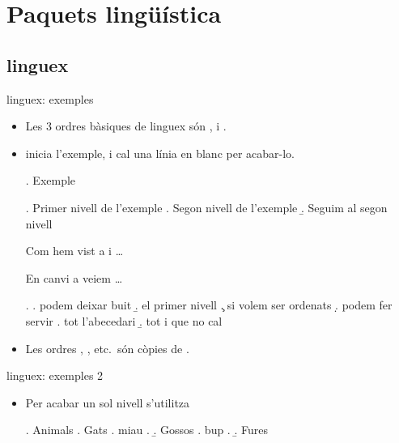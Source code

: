 \section{Paquets lingüística}
\subsection{linguex}
\begin{frame}[fragile]{linguex: exemples}
\begin{itemize}
\item Les 3 ordres bàsiques de linguex són ,  i . 
\item {} inicia l'exemple, i cal una línia en blanc per acabar-lo.
\begin{exampletwouptiny2}
\ex. Exemple

\ex. Primer nivell de l'exemple
\a. Segon nivell de l'exemple
\b. Seguim al segon nivell 

Com hem vist a \LLast i \Last \dots

En canvi a \Next veiem \dots

\ex. 
\a. podem deixar buit 
\b. el primer nivell
\c. si volem ser ordenats
\d. podem fer servir
\e. tot l'abecedari
\b. tot i que no cal

\end{exampletwouptiny2}
\item Les ordres , , etc.~són còpies de .
\end{itemize}
\end{frame}

\begin{frame}[fragile]{linguex: exemples 2}
\begin{itemize}
\item Per acabar un sol nivell s'utilitza  
\begin{exampletwouptiny2}
\ex. Animals 
\a. Gats
\a. miau
\z.
\b. Gossos
\a. bup
\z.
\b. Fures

\end{exampletwouptiny2}
\end{itemize}

\end{frame}


